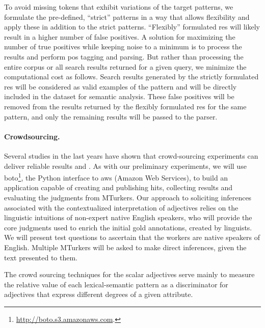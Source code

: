 \documentclass[10pt]{article}
\begin{document}
To avoid missing tokens that exhibit variations of the target patterns, we formulate the pre-defined, ``strict'' patterns in a way that allows flexibility and apply these in addition to the strict patterns. ``Flexibly'' formulated {\sc re}s will likely result in a higher number of false positives. A solution for maximizing the number of true positives while keeping noise to a minimum  is to process the results and perform {\sc pos} tagging and parsing. But rather than processing the entire corpus or all search results returned for a given query, we minimize the computational cost as follows. Search results generated by the strictly formulated {\sc re}s will be considered as valid examples of the pattern and will be directly included in the dataset for semantic analysis. These false positives will be removed from the results returned by the flexibly formulated {\sc re}s for the same pattern, and only the remaining results will be passed to the parser.

\paragraph{Crowdsourcing.}
Several studies in the last years have shown that crowd-sourcing experiments can deliver reliable results \cite{snow:08} and \cite{munroetal2010}. As with our preliminary experiments, we will use boto\footnote{\url{http://boto.s3.amazonaws.com}.}, the Python
interface to {\sc aws} (Amazon Web Services), to build an application capable of creating and publishing {\sc hit}s, collecting results and evaluating the 
judgments from MTurkers. Our approach to soliciting inferences associated with the
contextualized interpretation of adjectives relies on the linguistic
intuitions of non-expert native English speakers, who will provide the
core judgments used to enrich the initial gold annotations, created by
linguists. We will present test questions to ascertain that the workers are native speakers of English. Multiple MTurkers will be asked to make direct inferences, given the text presented to them. 


The crowd sourcing techniques for the scalar adjectives serve mainly to measure the relative value of each lexical-semantic pattern as a discriminator for adjectives that express different 
degrees of a given attribute. 

\end{document}
